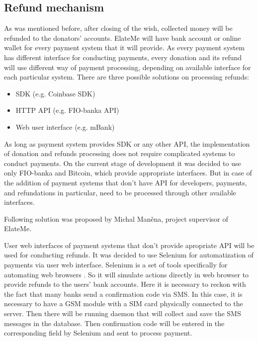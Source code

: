 \subsection{Refund mechanism}
As was mentioned before, after closing of the wish, collected money will be refunded to the donators' accounts. ElateMe
will have bank account or online wallet for every payment system that it will provide. As every payment system has
different interface for conducting payments, every donation and its refund will use different way of payment processing,
depending on available interface for each particular system. There are three possible solutions on processing refunds:

\begin{itemize}
    \item \ac{SDK} (e.g. Coinbase \ac{SDK})
    \item \ac{HTTP} \ac{API} (e.g. FIO-banka \ac{API})
    \item Web user interface (e.g. mBank)
\end{itemize}

As long as payment system provides \ac{SDK} or any other \ac{API}, the implementation of donation and refunds processing
does not require complicated systems to conduct payments. On the current stage of development it was decided to use only
FIO-banka and Bitcoin, which provide appropriate interfaces. But in case of the addition of payment systems that don't
have \ac{API} for developers, payments, and refundations in particular, need to be processed through other available
interfaces.

Following solution was proposed by Michal Maněna, project supervisor of ElateMe.

User web interfaces of payment systems that don't provide apropriate \ac{API} will be used for conducting refunds. It
was decided to use Selenium for automatization of payments via user web interface. Selenium is a set of tools
specifically for automating web browsers \cite{selenium}. So it will simulate actions directly in web browser to provide
refunds to the users' bank accounts. Here it is necessary to reckon with the fact that many banks send a confirmation
code via SMS. In this case, it is necessary to have a \ac{GSM} module with a SIM card physically connected to the
server. Then there will be running daemon that will collect and save the SMS messages in the database. Then confirmation
code will be entered in the corresponding field by Selenium and sent to process payment.


